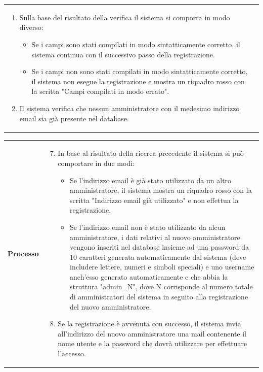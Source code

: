 \documentclass[10pt,a4paper]{report}
\begin{document}
\begin{tabular}{lp{}}
\begin{enumerate}
\begin{itemize}
			\end{itemize}
			\item Sulla base del risultato della verifica il sistema si comporta in modo diverso:
			\begin{itemize}
				\item Se i campi sono stati compilati in modo sintatticamente corretto, il sistema continua con il successivo passo della registrazione.
				\item Se i campi non sono stati compilati in modo sintatticamente corretto, il sistema non esegue la registrazione e mostra un riquadro rosso con la scritta "Campi compilati in modo errato".
			\end{itemize}
			\item Il sistema verifica che nessun amministratore con il medesimo indirizzo email sia già presente nel database.
		\end{enumerate}
	\end{tabular}

	\begin{tabular}{lp{}}
		\textbf{Processo}&\begin{enumerate}
			\setcounter{enumi}{6}
			\item In base al risultato della ricerca precedente il sistema si può comportare in due modi:
			\begin{itemize}
				\item Se l'indirizzo email è già stato utilizzato da un altro amministratore, il sistema mostra un riquadro rosso con la scritta "Indirizzo email già utilizzato" e non effettua la registrazione.
				\item Se l'indirizzo email non è stato utilizzato da alcun amministratore, i dati relativi al nuovo amministratore vengono inseriti nel database insieme ad una password da 10 caratteri generata automaticamente dal sistema (deve includere lettere, numeri e simboli speciali) e uno username anch'esso generato automaticamente e che abbia la struttura "admin\_N", dove N corrisponde al numero totale di amministratori del sistema in seguito alla registrazione del nuovo amministratore.
			\end{itemize}
			\item Se la registrazione è avvenuta con successo, il sistema invia all'indirizzo del nuovo amministratore una mail contenente il nome utente e la password che dovrà utilizzare per effettuare l'accesso.
		\end{enumerate}
	\end{tabular}
	
\end{document}
